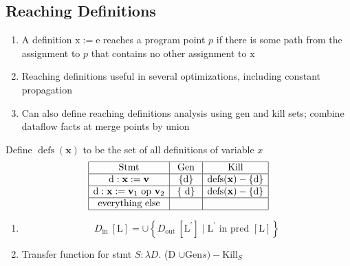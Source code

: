 \documentclass[a4paper]{article}
\theoremstyle{definition}
\begin{document}
\subsection{Reaching Definitions}
\begin{enumerate}
    \item A definition $\mathrm{x}:=\mathrm{e}$ reaches a program point $p$ if there is some path from the assignment to $p$ that contains no other assignment to $\mathrm{x}$
\item Reaching definitions useful in several optimizations, including constant propagation
\item Can also define reaching definitions analysis using gen and kill sets; combine dataflow facts at merge points by union
\end{enumerate}
Define $\operatorname{defs}(\mathbf{x})$ to be the set of all definitions of variable $x$
$$\begin{array}{|c|c|c|}
\hline \text { Stmt } & \text { Gen } & \text { Kill } \\
\hline \mathrm{d}: \mathbf{x}:=\mathbf{v} & \{\mathrm{d}\} & \operatorname{defs}(\mathbf{x})-\{\mathrm{d}\} \\
\hline \mathrm{d}: \mathbf{x}:=\mathbf{v}_{1} \text { op } \mathbf{v}_{2} & \{\mathrm{~d}\} & \operatorname{defs}(\mathbf{x})-\{\mathrm{d}\} \\
\hline \text { everything else } &  &  \\
\hline
\end{array}$$
\begin{enumerate}
    \item $$
D_{\text {in }}[\mathrm{L}]=\cup\left\{D_{\text {out }}\left[\mathrm{L}^{\prime}\right] \mid \mathrm{L}^{\prime} \text { in pred }[\mathrm{L}]\right\}
$$
\item Transfer function for stmt $S: \lambda D$. (D $\cup \mathrm{Gen} s)-\mathrm{Kill}_{S}$
\end{enumerate}
\end{document}
